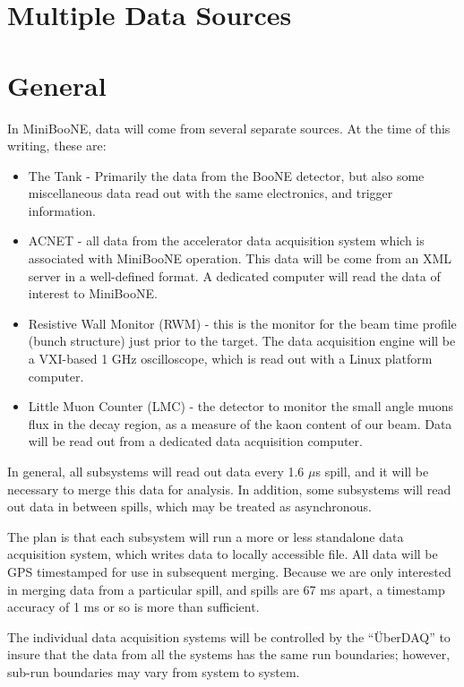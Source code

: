 


\section{Multiple Data Sources}

\section{General}

In MiniBooNE, data will come from several separate sources.  At the time of 
this writing, these are:
\begin{itemize}
\item The Tank - Primarily the data from the BooNE detector, but also some 
miscellaneous data read out with the same electronics, and trigger information.
\item ACNET - all data from the accelerator data acquisition system which is
associated with MiniBooNE operation.  This data will be come from an XML
server in a well-defined format.  A dedicated computer will read the data
of interest to MiniBooNE.
\item Resistive Wall Monitor (RWM) - this is the monitor for the beam time
profile (bunch structure) just prior to the target. The data acquisition
engine will be a VXI-based 1 GHz oscilloscope, which is
read out with a Linux platform computer.
\item Little Muon Counter (LMC) - the detector to monitor the
small angle muons flux in the decay region, as a measure of the
kaon content of our beam.  Data will be read out from a dedicated
data acquisition computer.
\end{itemize}

In general, all subsystems will read out data every 1.6 $\mu $s spill, and 
it will be necessary to merge this data for analysis.  In addition, some 
subsystems will read out data in between spills, which may be treated
as asynchronous.

The plan is that each subsystem will run a more or less standalone
data acquisition system, which writes data to locally accessible file.
All data will be GPS timestamped for use in subsequent merging. Because
we are only interested in merging data from a particular spill, and
spills are 67 ms apart, a timestamp accuracy of 1 ms or so is more
than sufficient.

The individual data acquisition systems will be controlled by the
``\"{U}berDAQ'' to insure that the data from all the systems has the
same run boundaries; however, sub-run boundaries may vary from system
to system.

